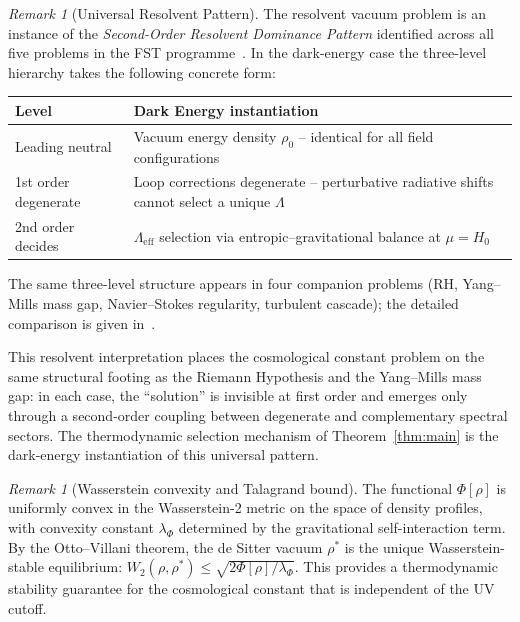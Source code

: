 \documentclass[12pt,a4paper]{article}
\theoremstyle{definition}
\theoremstyle{plain}
\theoremstyle{remark}
\newtheorem{remark}[definition]{Remark}
\begin{document}
\begin{remark}[Universal Resolvent Pattern]\label{rem:universal-resolvent}
The resolvent vacuum problem is an instance of the \emph{Second-Order
Resolvent Dominance Pattern} identified across all five problems in the
FST programme~\cite{FST-Unified2026}.  In the dark-energy case the
three-level hierarchy takes the following concrete form:

\begin{center}
\begin{tabular}{p{3.5cm}p{8.5cm}}
\hline
\textbf{Level} & \textbf{Dark Energy instantiation} \\
\hline
Leading neutral   & Vacuum energy density $\rho_0$ -- identical for all field configurations \\
1st order degenerate & Loop corrections degenerate -- perturbative radiative shifts cannot select a unique $\Lambda$ \\
2nd order decides & $\Lambda_{\mathrm{eff}}$ selection via entropic--gravitational balance at $\mu = H_0$ \\
\hline
\end{tabular}
\end{center}

\noindent
The same three-level structure appears in four companion problems
(RH, Yang--Mills mass gap, Navier--Stokes regularity, turbulent cascade);
the detailed comparison is given in~\cite{FST-Unified2026}.
\end{remark}

\noindent
This resolvent interpretation places the cosmological constant problem on
the same structural footing as the Riemann Hypothesis and the Yang--Mills
mass gap: in each case, the ``solution'' is invisible at first order and
emerges only through a second-order coupling between degenerate and
complementary spectral sectors. The thermodynamic selection mechanism of
Theorem~\ref{thm:main} is the dark-energy instantiation of this universal
pattern.

\begin{remark}[Wasserstein convexity and Talagrand bound]
\label{rem:talagrand}
The functional $\Phi[\rho]$ is uniformly convex in the Wasserstein-2 metric on the space of density profiles, with convexity constant $\lambda_\Phi$ determined by the gravitational self-interaction term. By the Otto--Villani theorem, the de Sitter vacuum $\rho^*$ is the unique Wasserstein-stable equilibrium: $W_2(\rho, \rho^*) \leq \sqrt{2 \Phi[\rho] / \lambda_\Phi}$. This provides a thermodynamic stability guarantee for the cosmological constant that is independent of the UV cutoff.
\end{remark}
\end{document}
